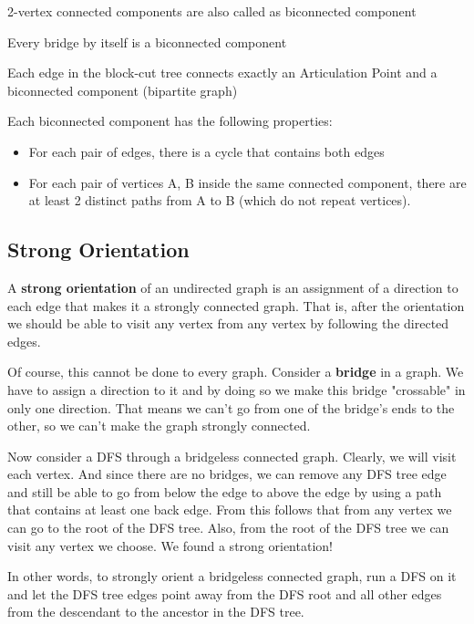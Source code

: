 	2-vertex connected components are also called as biconnected component
	
	Every bridge by itself is a biconnected component

	Each edge in the block-cut tree connects exactly an Articulation Point and a biconnected component (bipartite graph)

	Each biconnected component has the following properties:

	\begin{itemize}
		\item For each pair of edges, there is a cycle that contains both edges
		\item For each pair of vertices {A, B} inside the same connected component, there are at least 2 distinct paths from A to B (which do not repeat vertices).
	\end{itemize}

	

	\subsection{Strong Orientation}

	A \textbf{strong orientation} of an undirected graph is an assignment of a direction to each edge that makes it a strongly connected graph.
	That is, after the orientation we should be able to visit any vertex from any vertex by following the directed edges.

	Of course, this cannot be done to every graph. Consider a \textbf{bridge} in a graph.
	We have to assign a direction to it and by doing so we make this bridge "crossable" in only one direction.
	That means we can't go from one of the bridge's ends to the other, so we can't make the graph strongly connected.

	Now consider a DFS through a bridgeless connected graph. Clearly, we will visit each vertex.
	And since there are no bridges, we can remove any DFS tree edge and still be able to go from below the edge to
	above the edge by using a path that contains at least one back edge. 
	From this follows that from any vertex we can go to the root of the DFS tree. 
	Also, from the root of the DFS tree we can visit any vertex we choose. We found a strong orientation!

	In other words, to strongly orient a bridgeless connected graph, 
	run a DFS on it and let the DFS tree edges point away from the DFS root and all other edges 
	from the descendant to the ancestor in the DFS tree.

